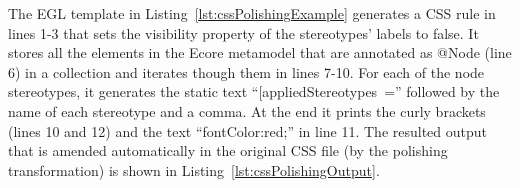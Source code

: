 
The EGL template in Listing~\ref{lst:cssPolishingExample} generates a CSS rule in lines 1-3 that sets the visibility property of the stereotypes' labels to false. 
It stores all the elements in the Ecore metamodel that are annotated as @Node (line 6) in a collection and iterates though them in lines 7-10. 
For each of the node stereotypes, it generates the static text ``[appliedStereotypes~='' followed by the name of each stereotype and a comma. 
At the end it prints the curly brackets (lines 10 and 12) and the text ``fontColor:red;'' in line 11. 
The resulted output that is amended automatically in the original CSS file (by the polishing transformation) is shown in Listing~\ref{lst:cssPolishingOutput}.

\begin{figure}[ht!]
	\vspace*{-5mm}
	
\end{figure}


